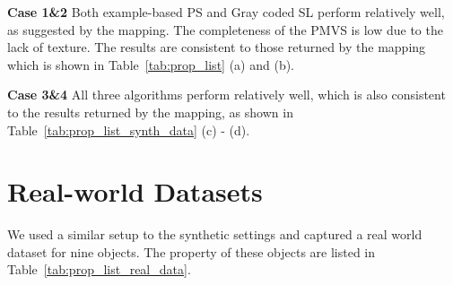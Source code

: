 \textbf{Case 1\&2} Both example-based PS and Gray coded SL perform relatively well, as suggested by the mapping. The completeness of the PMVS is low due to the lack of texture. The results are consistent to those returned by the mapping which is shown in Table~\ref{tab:prop_list} (a) and (b).

\textbf{Case 3\&4} All three algorithms perform relatively well, which is also consistent to the results returned by the mapping, as shown in Table~\ref{tab:prop_list_synth_data} (c) - (d).

\section{Real-world Datasets}
We used a similar setup to the synthetic settings and captured a real world dataset for nine objects. The property of these objects are listed in Table~\ref{tab:prop_list_real_data}.

